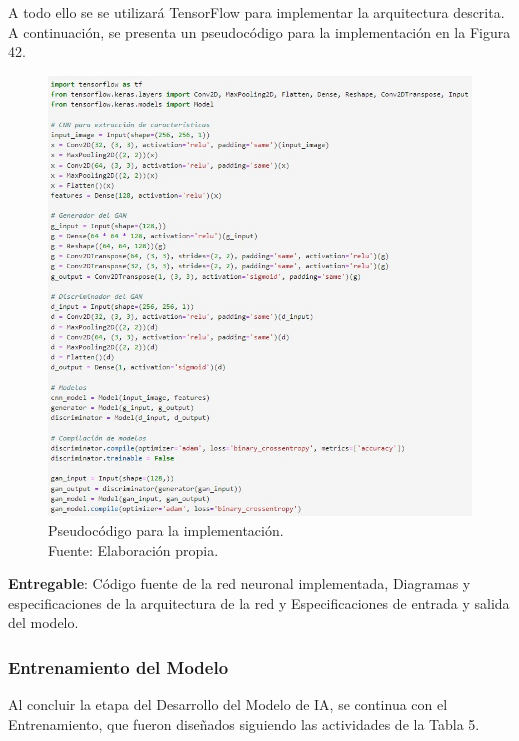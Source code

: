 A todo ello se se utilizará TensorFlow para implementar la arquitectura descrita. A continuación, se presenta un pseudocódigo para la implementación en la Figura 42.

\begin{figure}[H]
	\centering
	\includegraphics[width=1\textwidth]{3/figures/pseudocodigo.jpg}
	\caption[Pseudocódigo para la implementación]{Pseudocódigo para la implementación.\\ Fuente: Elaboración propia.}
	\label{3:7}
\end{figure}

\textbf{Entregable}: Código fuente de la red neuronal implementada, Diagramas y especificaciones de la arquitectura de la red y Especificaciones de entrada y salida del modelo.

\subsubsection{Entrenamiento del Modelo}
Al concluir la etapa del Desarrollo del Modelo de IA, se continua con el Entrenamiento, que fueron diseñados siguiendo las actividades de la Tabla 5.

